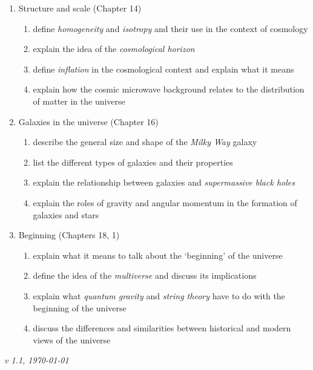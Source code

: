 \documentclass[11pt]{article}
\begin{document}
\begin{enumerate}
\item Structure and scale (Chapter 14)
\begin{enumerate}
\item define {\em homogeneity} and {\em isotropy} and their use in the context of cosmology
\item explain the idea of the {\em cosmological horizon}
\item define {\em inflation} in the cosmological context and explain what it means
\item explain how the cosmic microwave background relates to the distribution
of matter in the universe
\end{enumerate}


\item Galaxies in the universe (Chapter 16)
\begin{enumerate}
\item describe the general size and shape of the {\em Milky Way} galaxy
\item list the different types of galaxies and their properties
\item explain the relationship between galaxies and {\em supermassive black holes}
\item explain the roles of gravity and angular momentum in the formation of galaxies and stars
\end{enumerate}

\item Beginning (Chapters 18, 1)
\begin{enumerate}
\item explain what it means to talk about the `beginning' of the universe
\item define the idea of the {\em multiverse} and discuss its implications
\item explain what {\em quantum gravity} and {\em  string theory} have to do with the beginning of
the universe
\item discuss the differences and similarities between historical and modern views of the universe
\end{enumerate}

\end{enumerate}

\vspace{1cm}
\it{v 1.1, \today}
\end{document}

